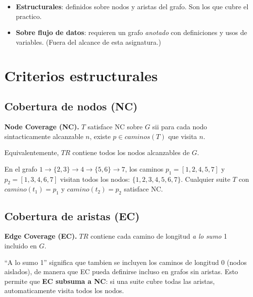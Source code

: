 \documentclass[12pt,a4paper]{article}
\begin{document}
\begin{itemize}
  \item \textbf{Estructurales}: definidos sobre nodos y aristas del grafo. Son los que cubre el
  practico.
  \item \textbf{Sobre flujo de datos}: requieren un grafo \emph{anotado} con definiciones y usos
  de variables. (Fuera del alcance de esta asignatura.)
\end{itemize}

\section{Criterios estructurales}

\subsection{Cobertura de nodos (NC)}

\begin{definicionbox}
\textbf{Node Coverage (NC).} $T$ satisface NC sobre $G$ sii para cada nodo sintacticamente
alcanzable $n$, existe $p \in \textit{caminos}(T)$ que visita $n$.

Equivalentemente, $TR$ contiene todos los nodos alcanzables de $G$.
\end{definicionbox}

\begin{ejemplobox}
En el grafo $1 \to \{2, 3\} \to 4 \to \{5, 6\} \to 7$, los caminos
$p_1 = [1,2,4,5,7]$ y $p_2 = [1,3,4,6,7]$ visitan todos los nodos: $\{1,2,3,4,5,6,7\}$. Cualquier
suite $T$ con $\textit{camino}(t_1) = p_1$ y $\textit{camino}(t_2) = p_2$ satisface NC.
\end{ejemplobox}

\subsection{Cobertura de aristas (EC)}

\begin{definicionbox}
\textbf{Edge Coverage (EC).} $TR$ contiene cada camino de longitud \emph{a lo sumo} 1 incluido
en $G$.
\end{definicionbox}

``A lo sumo 1'' significa que tambien se incluyen los caminos de longitud 0 (nodos aislados), de
manera que EC pueda definirse incluso en grafos sin aristas. Esto permite que \textbf{EC subsuma
a NC}: si una suite cubre todas las aristas, automaticamente visita todos los nodos.
\end{document}
